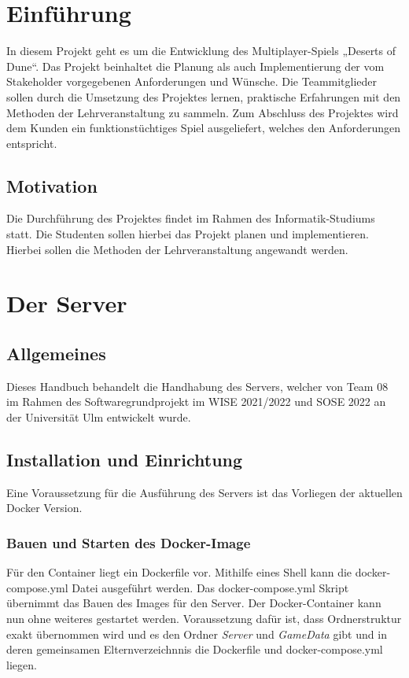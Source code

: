 \documentclass[12pt]{article}
\newcounter{fa}
\begin{document}
\tableofcontents
\thispagestyle{empty}

\newpage

\pagestyle{fancy}

\fancyhead[R]{\thepage}
\fancyhead[L]{\leftmark}
\fancyfoot{}


\section{Einführung}

In diesem Projekt geht es um die Entwicklung des Multiplayer-Spiels „Deserts of Dune“.
Das Projekt beinhaltet die Planung als auch Implementierung der vom Stakeholder vorgegebenen
Anforderungen und Wünsche. Die Teammitglieder sollen durch die Umsetzung des Projektes lernen, praktische Erfahrungen mit den Methoden der Lehrveranstaltung zu sammeln. Zum Abschluss des Projektes wird dem Kunden ein funktionstüchtiges Spiel ausgeliefert, welches den Anforderungen entspricht.


\subsection{Motivation}

Die Durchführung des Projektes findet im Rahmen des Informatik-Studiums statt. Die Studenten sollen hierbei das Projekt planen und implementieren. Hierbei sollen die Methoden der Lehrveranstaltung angewandt werden.

\newpage


\section{Der Server}

\subsection{Allgemeines}
Dieses Handbuch behandelt die Handhabung des Servers, welcher von Team 08 im Rahmen des Softwaregrundprojekt im
WISE 2021/2022 und SOSE 2022 an der Universität Ulm entwickelt wurde.

\subsection{Installation und Einrichtung}
Eine Voraussetzung für die Ausführung des Servers ist das Vorliegen der aktuellen Docker Version.

\subsubsection{Bauen und Starten des Docker-Image}
Für den Container liegt ein Dockerfile vor. Mithilfe eines Shell kann die docker-compose.yml Datei ausgeführt werden. Das docker-compose.yml Skript übernimmt das Bauen des Images für den Server. Der Docker-Container kann nun ohne weiteres gestartet werden. 
Voraussetzung dafür ist, dass Ordnerstruktur exakt übernommen wird und es den Ordner \textit{Server} und \textit{GameData} gibt und in deren gemeinsamen Elternverzeichnnis die Dockerfile und docker-compose.yml liegen.
\end{document}
